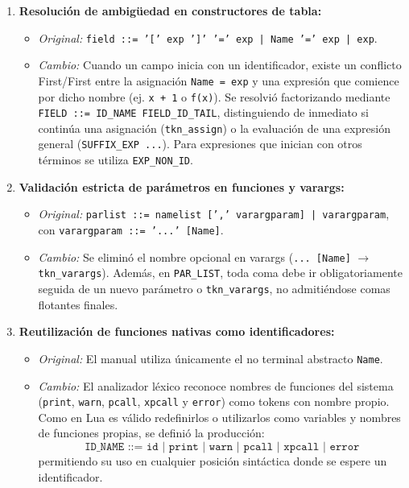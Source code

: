 \documentclass[10pt,letterpaper]{article}
\begin{document}
\begin{enumerate}
  \item \textbf{Resolución de ambigüedad en constructores de tabla:}
  \begin{itemize}
    \item \textit{Original:} \texttt{field ::= '[' exp ']' '=' exp | Name '=' exp | exp}.
    \item \textit{Cambio:} Cuando un campo inicia con un identificador, existe un conflicto First/First entre la asignación \texttt{Name = exp} y una expresión que comience por dicho nombre (ej. \texttt{x + 1} o \texttt{f(x)}). Se resolvió factorizando mediante \texttt{FIELD ::= ID\_NAME FIELD\_ID\_TAIL}, distinguiendo de inmediato si continúa una asignación (\texttt{tkn\_assign}) o la evaluación de una expresión general (\texttt{SUFFIX\_EXP ...}). Para expresiones que inician con otros términos se utiliza \texttt{EXP\_NON\_ID}.
  \end{itemize}

  \item \textbf{Validación estricta de parámetros en funciones y varargs:}
  \begin{itemize}
    \item \textit{Original:} \texttt{parlist ::= namelist [',' varargparam] | varargparam}, con \texttt{varargparam ::= '...' [Name]}.
    \item \textit{Cambio:} Se eliminó el nombre opcional en varargs (\texttt{... [Name]} $\rightarrow$ \texttt{tkn\_varargs}). Además, en \texttt{PAR\_LIST}, toda coma debe ir obligatoriamente seguida de un nuevo parámetro o \texttt{tkn\_varargs}, no admitiéndose comas flotantes finales.
  \end{itemize}

  \item \textbf{Reutilización de funciones nativas como identificadores:}
  \begin{itemize}
    \item \textit{Original:} El manual utiliza únicamente el no terminal abstracto \texttt{Name}.
    \item \textit{Cambio:} El analizador léxico reconoce nombres de funciones del sistema (\texttt{print}, \texttt{warn}, \texttt{pcall}, \texttt{xpcall} y \texttt{error}) como tokens con nombre propio. Como en Lua es válido redefinirlos o utilizarlos como variables y nombres de funciones propias, se definió la producción:
    \[\texttt{ID\_NAME ::= id | print | warn | pcall | xpcall | error}\]
    permitiendo su uso en cualquier posición sintáctica donde se espere un identificador.
  \end{itemize}


\end{enumerate}
\end{document}
